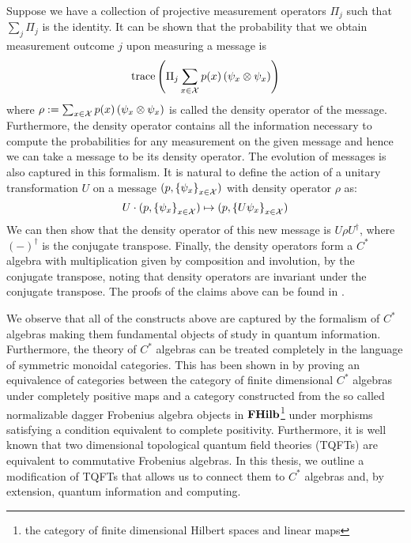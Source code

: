 Suppose we have a collection of projective measurement operators $\Pi_j$ such
that $\sum_{j} \Pi_j$ is the identity. It can be shown that the probability that
we obtain measurement outcome $j$ upon measuring a message is
\[
  \text{trace}\left( \Pi_j \sum_{x \in \mathcal{X}} p(x) \left( \psi_x \otimes \psi_x \right) \right)
\]
where $\rho := \sum_{x \in \mathcal{X}} p(x) \left( \psi_x \otimes \psi_x \right)$ is called
the density operator of the message. Furthermore, the density operator contains
all the information necessary to compute the probabilities for any measurement
on the given message and hence we can take a message to be its density operator.
The evolution of messages is also captured in this formalism. It is natural to
define the action of a unitary transformation $U$ on a message
$(p, \set{\psi_x}_{x \in \mathcal{X}})$ with density operator $\rho$ as:
\[
  U \cdot (p, \set{\psi_x}_{x \in \mathcal{X}})
    \mapsto (p, \set{U\psi_x}_{x \in \mathcal{X}})
\]
We can then show that the density operator of this new message is
$U \rho U^{\dagger}$, where $(-)^{\dagger}$ is the conjugate transpose. Finally,
the density operators form a $C^*$ algebra with multiplication given by
composition and involution, by the conjugate transpose, noting that density
operators are invariant under the conjugate transpose. The proofs of the claims
above can be found in \cite[{$\S 4$}]{cqshannon}.

We observe that all of the constructs above are captured by the formalism of
$C^*$ algebras making them fundamental objects of study in quantum information.
Furthermore, the theory of $C^*$ algebras can be treated completely in the
language of symmetric monoidal categories. This has been shown in
\cite{channels} by proving an equivalence of categories between the category of
finite dimensional $C^*$ algebras under completely positive maps and a category
constructed from the so called normalizable dagger Frobenius algebra objects in
$\textbf{FHilb}$\footnote{the category of finite dimensional Hilbert spaces and linear
maps} under morphisms satisfying a condition equivalent to complete positivity.
Furthermore, it is well known that two dimensional topological quantum field
theories (TQFTs) are equivalent to commutative Frobenius algebras. In this
thesis, we outline a modification of TQFTs that allows us to connect them to
$C^*$ algebras and, by extension, quantum information and computing.

